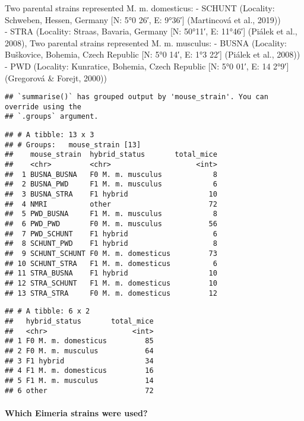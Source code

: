 \documentclass[
]{article}
\begin{document}
Two parental strains represented M. m. domesticus: - SCHUNT (Locality:
Schweben, Hessen, Germany {[}N: 5°0 26′, E: 9°36′{]} (Martincová et al.,
2019))\\
- STRA (Locality: Straas, Bavaria, Germany {[}N: 50°11′, E: 11°46′{]}
(Piálek et al., 2008), Two parental strains represented M. m. musculus:
- BUSNA (Locality: Buškovice, Bohemia, Czech Republic {[}N: 5°0 14′, E:
1°3 22′{]} (Piálek et al., 2008)) - PWD (Locality: Kunratice, Bohemia,
Czech Republic {[}N: 5°0 01′, E: 14 2°9′{]} (Gregorová \& Forejt, 2000))

\begin{verbatim}
## `summarise()` has grouped output by 'mouse_strain'. You can override using the
## `.groups` argument.
\end{verbatim}

\begin{verbatim}
## # A tibble: 13 x 3
## # Groups:   mouse_strain [13]
##    mouse_strain  hybrid_status       total_mice
##    <chr>         <chr>                    <int>
##  1 BUSNA_BUSNA   F0 M. m. musculus            8
##  2 BUSNA_PWD     F1 M. m. musculus            6
##  3 BUSNA_STRA    F1 hybrid                   10
##  4 NMRI          other                       72
##  5 PWD_BUSNA     F1 M. m. musculus            8
##  6 PWD_PWD       F0 M. m. musculus           56
##  7 PWD_SCHUNT    F1 hybrid                    6
##  8 SCHUNT_PWD    F1 hybrid                    8
##  9 SCHUNT_SCHUNT F0 M. m. domesticus         73
## 10 SCHUNT_STRA   F1 M. m. domesticus          6
## 11 STRA_BUSNA    F1 hybrid                   10
## 12 STRA_SCHUNT   F1 M. m. domesticus         10
## 13 STRA_STRA     F0 M. m. domesticus         12
\end{verbatim}

\begin{verbatim}
## # A tibble: 6 x 2
##   hybrid_status       total_mice
##   <chr>                    <int>
## 1 F0 M. m. domesticus         85
## 2 F0 M. m. musculus           64
## 3 F1 hybrid                   34
## 4 F1 M. m. domesticus         16
## 5 F1 M. m. musculus           14
## 6 other                       72
\end{verbatim}

\hypertarget{which-eimeria-strains-were-used}{%
\paragraph{Which Eimeria strains were
used?}\label{which-eimeria-strains-were-used}}
\end{document}
